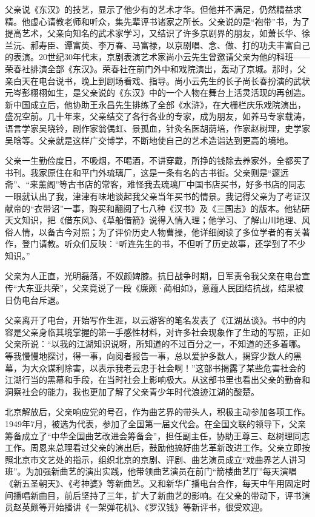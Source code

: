 \documentclass[12pt,UTF8]{ctexbook}
\begin{document}
父亲说《东汉》的技艺，显示了他少有的艺术才华。但他并不满足，仍然精益求精。他虚心请教老师和听众，集先辈评书诸家之所长。父亲说的是“袍带”书，为了提高艺术，父亲向知名的武术家学习，又结识了许多京剧界的朋友，如萧长华、徐兰沅、郝寿臣、谭富英、李万春、马富禄，以京剧唱、念、做、打的功夫丰富自己的表演。20世纪30年代末，京剧表演艺术家尚小云先生曾邀请父亲为他的科班——荣春社排演全部《东汉》。荣春社在前门外中和戏院演出，轰动了京城。那时，父亲白天在电台说书，晚上到剧场看戏、指导。尚小云先生的长子尚长春扮演的武状元岑彭栩栩如生，是父亲说的《东汉》中的一个人物在舞台上活灵活现的再创造。新中国成立后，他协助王永昌先生排练了全部《水浒》，在大栅栏庆乐戏院演出，盛况空前。几十年来，父亲结交了各行各业的专家，成为朋友，如养马专家载涛，语言学家吴晓铃，剧作家翁偶虹、景孤血，针灸名医胡荫培，作家赵树理，史学家吴晗等。父亲就是这样广交博学，不断地使自己的艺术造诣达到更高的境地。

父亲一生勤俭度日，不吸烟，不喝酒，不讲穿戴，所挣的钱除去养家外，全都买了书刊。我家原住在和平门外琉璃厂，这是一条有名的古书街。父亲则是“邃远斋”、“来薰阁”等古书店的常客，难怪我去琉璃厂中国书店买书，好多书店的同志一眼就认出了我，津津有味地谈起我父亲当年买书的情景。我记得父亲为了考证汉献帝的“衣带诏”一事，购买和翻阅了七八种《汉书》及《三国志》的版本。他钻研天文知识，把《借东风》、《草船借箭》说得入情入理；他学习、了解山川地理、风俗人情，以备古今对照；为了评价历史人物曹操，他详细阅读了多位学者的有关著作，登门请教。听众们反映：“听连先生的书，不但听了历史故事，还学到了不少知识。”

父亲为人正直，光明磊落，不奴颜婢膝。抗日战争时期，日军责令我父亲在电台宣传“大东亚共荣”，父亲竟说了一段《廉颇·蔺相如》，意蕴人民团结抗战，结果被日伪电台斥退。

父亲离开了电台，开始写作生涯，以云游客的笔名发表了《江湖丛谈》。书中的内容是父亲身临其境掌握的第一手感性材料，对许多社会现象作了生动的写照，正如父亲所说：“以我的江湖知识说呀，所知道的不过百分之一，不知道的还多着哪。等我慢慢地探讨，得一事，向阅者报告一事，总以爱护多数人，揭穿少数人的黑幕，为大众谋利除害，以表示我老云忠于社会啊！”这部书揭露了某些危害社会的江湖行当的黑幕和手段，在当时社会上影响极大。从这部书里也看出父亲的勤奋和洞察社会的能力，我也更加了解了父亲青少年时代浪迹江湖的酸楚。

北京解放后，父亲响应党的号召，作为曲艺界的带头人，积极主动参加各项工作。1949年7月，被选为代表，参加了全国第一届文代会。在全国文联的领导下，父亲筹备成立了“中华全国曲艺改进会筹备会”，担任副主任，协助王尊三、赵树理同志工作。周恩来总理看过父亲的演出后，鼓励他搞好曲艺革新改进工作。父亲立即按照北京市文艺处的指示，组织北京的京剧、评剧、曲艺演员成立“戏曲界艺人讲习班”。为加强新曲艺的演出实践，他带领曲艺演员在前门“箭楼曲艺厅”每天演唱《新五圣朝天》、《考神婆》等新曲艺。又和新华广播电台合作，每天中午用固定时间播唱新曲目，前后坚持了三年，扩大了新曲艺的影响。在父亲的带动下，评书演员赵英颇等开始播讲《一架弹花机》、《罗汉钱》等新评书，很受欢迎。
\end{document}
